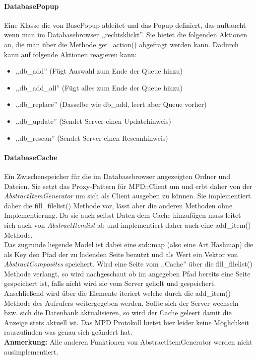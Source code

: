 \paragraph{DatabasePopup}
Eine Klasse die von BasePopup ableitet und das Popup definiert, das auftaucht wenn man im Databasebrowser ,,rechtsklickt''.
Sie bietet die folgenden Aktionen an, die man über die Methode get\_action() abgefragt werden kann.
Dadurch kann auf folgende Aktionen reagieren kann:
\begin{itemize}
\item ,,db\_add'' (Fügt Auswahl zum Ende der Queue hinzu)
\item ,,db\_add\_all'' (Fügt alles zum Ende der Queue hinzu)
\item ,,db\_replace'' (Dasselbe wie db\_add, leert aber Queue vorher)
\item ,,db\_update'' (Sendet Server einen Updatehinweis)
\item ,,db\_rescan'' (Sendet Server einen Rescanhinweis)
\end{itemize}

\paragraph{DatabaseCache}
Ein Zwischenspeicher für die im Databasebrowser angezeigten Ordner und Dateien. 
Sie setzt das Proxy-Pattern für MPD::Client um und erbt daher von der \emph{AbstractItemGenerator} um sich als Client ausgeben zu können.
Sie implementiert daher die fill\_filelist() Methode vor, lässt aber die anderen Methoden ohne Implementierung.
Da sie auch selbst Daten dem Cache hinzufügen muss leitet sich auch von \emph{AbstractItemlist} ab und implementiert daher auch eine add\_item() Methode. 
\\
Das zugrunde liegende Model ist dabei eine std::map (also eine Art Hashmap) die als Key den Pfad der zu ladenden Seite benutzt
und als Wert ein Vektor von \emph{AbstractComposites} speichert. Wird eine Seite vom ,,Cache'' über die fill\_filelist() Methode verlangt,
so wird nachgeschaut ob im angegeben Pfad bereits eine Seite gespeichert ist, falls nicht wird sie vom Server geholt und gespeichert. 
Anschließend wird über die Elemente iteriert welche durch die add\_item() Methode des Aufrufers weitergegeben werden. 
Sollte sich der Server wechseln bzw. sich die Datenbank aktualisieren, so wird der Cache geleert damit die Anzeige stets aktuell ist. Das MPD Protokoll bietet hier leider keine Möglichkeit rauszufinden was genau sich geändert hat.
\\
\textbf{Anmerkung:} Alle anderen Funktionen von AbstractItemGenerator werden nicht ausimplementiert.

